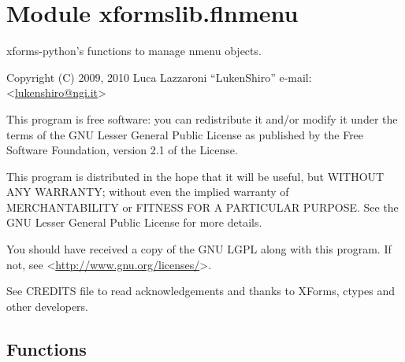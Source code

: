 %
%
%


\section{Module xformslib.flnmenu}

    \label{xformslib:flnmenu}

xforms-python's functions to manage nmenu objects.

Copyright (C) 2009, 2010  Luca Lazzaroni ``LukenShiro''
e-mail: <\href{mailto:lukenshiro@ngi.it}{lukenshiro@ngi.it}>

This program is free software: you can redistribute it and/or modify
it under the terms of the GNU Lesser General Public License as
published by the Free Software Foundation, version 2.1 of the License.

This program is distributed in the hope that it will be useful,
but WITHOUT ANY WARRANTY; without even the implied warranty of
MERCHANTABILITY or FITNESS FOR A PARTICULAR PURPOSE. See the
GNU Lesser General Public License for more details.

You should have received a copy of the GNU LGPL along with this
program. If not, see <\href{http://www.gnu.org/licenses/}{http://www.gnu.org/licenses/}>.

See CREDITS file to read acknowledgements and thanks to XForms,
ctypes and other developers.


  \subsection{Functions}

    \label{xformslib:flnmenu:fl_add_nmenu}


